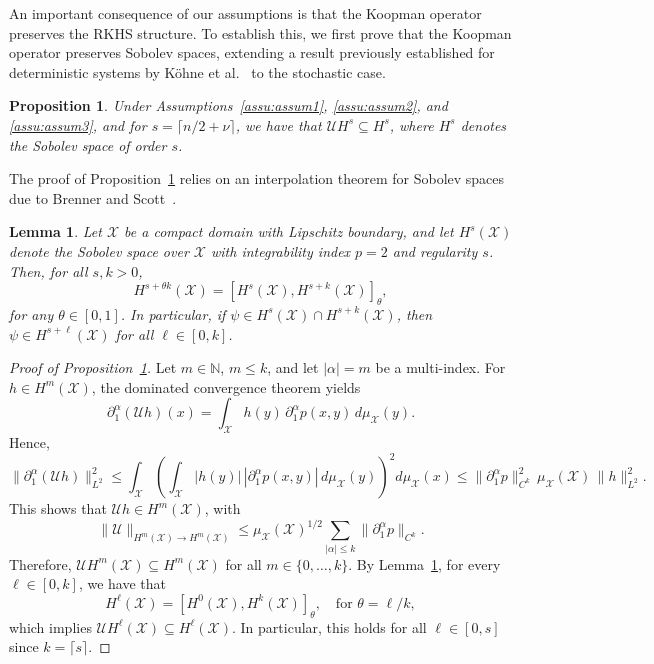 \documentclass{article}
\newtheorem{prop}{Proposition}
\newtheorem{lem}{Lemma}
\begin{document}
An important consequence of our assumptions is that the Koopman operator preserves the RKHS structure. To establish this, we first prove that the Koopman operator preserves Sobolev spaces, extending a result previously established for deterministic systems by Köhne et al.~\cite{Kohne2025boldsymbolLboldsymbolinftyDecomposition} to the stochastic case.

\begin{prop} \label{prop:koopman_preserve}
Under Assumptions~\ref{assu:assum1}, \ref{assu:assum2}, and \ref{assu:assum3}, and for \( s = \lceil n/2 + \nu \rceil \), we have that \( \mathcal{U} H^s \subseteq H^s \), where \( H^s \) denotes the Sobolev space of order \( s \).
\end{prop}

The proof of Proposition~\ref{prop:koopman_preserve} relies on an interpolation theorem for Sobolev spaces due to Brenner and Scott~\cite{Brenner2008TheMethods}.

\begin{lem} \label{lema:interpolation}
Let \( \mathcal{X} \) be a compact domain with Lipschitz boundary, and let \( H^s(\mathcal{X}) \) denote the Sobolev space over \( \mathcal{X} \) with integrability index \( p = 2 \) and regularity \( s \). Then, for all \( s, k > 0 \),
\[
H^{s + \theta k}(\mathcal{X}) = [H^s(\mathcal{X}), H^{s + k}(\mathcal{X})]_\theta,
\]
for any \( \theta \in [0, 1] \). In particular, if \( \psi \in H^s(\mathcal{X}) \cap H^{s + k}(\mathcal{X}) \), then \( \psi \in H^{s + \ell}(\mathcal{X}) \) for all \( \ell \in [0, k] \).
\end{lem}

\begin{proof}[Proof of Proposition~\ref{prop:koopman_preserve}]
Let \( m \in \mathbb{N} \), \( m \leq k \), and let \( |\alpha| = m \) be a multi-index. For \( h \in H^m(\mathcal{X}) \), the dominated convergence theorem yields
\[
\partial_1^\alpha (\mathcal{U} h)(x) = \int_{\mathcal{X}} h(y) \, \partial_1^\alpha p(x, y) \, d\mu_{\mathcal{X}}(y).
\]
Hence,
\[
\| \partial_1^\alpha (\mathcal{U} h) \|_{L^2}^2 
\leq \int_{\mathcal{X}} \left( \int_{\mathcal{X}} |h(y)| \, |\partial_1^\alpha p(x, y)| \, d\mu_{\mathcal{X}}(y) \right)^2 d\mu_{\mathcal{X}}(x)
\leq \| \partial_1^\alpha p \|_{C^k}^2 \, \mu_{\mathcal{X}}(\mathcal{X}) \, \| h \|_{L^2}^2.
\]
This shows that \( \mathcal{U} h \in H^m(\mathcal{X}) \), with
\[
\| \mathcal{U} \|_{H^m(\mathcal{X}) \to H^m(\mathcal{X})} \leq \mu_{\mathcal{X}}(\mathcal{X})^{1/2} \sum_{|\alpha| \leq k} \| \partial_1^\alpha p \|_{C^k}.
\]
Therefore, \( \mathcal{U} H^m(\mathcal{X}) \subseteq H^m(\mathcal{X}) \) for all \( m \in \{0, \dots, k\} \). By Lemma~\ref{lema:interpolation}, for every \( \ell \in [0, k] \), we have that
\[
H^\ell(\mathcal{X}) = [H^0(\mathcal{X}), H^k(\mathcal{X})]_\theta, \quad \text{for } \theta = \ell / k,
\]
which implies \( \mathcal{U} H^\ell(\mathcal{X}) \subseteq H^\ell(\mathcal{X}) \). In particular, this holds for all \( \ell \in [0, s] \) since \( k = \lceil s \rceil \).
\end{proof}
\end{document}
